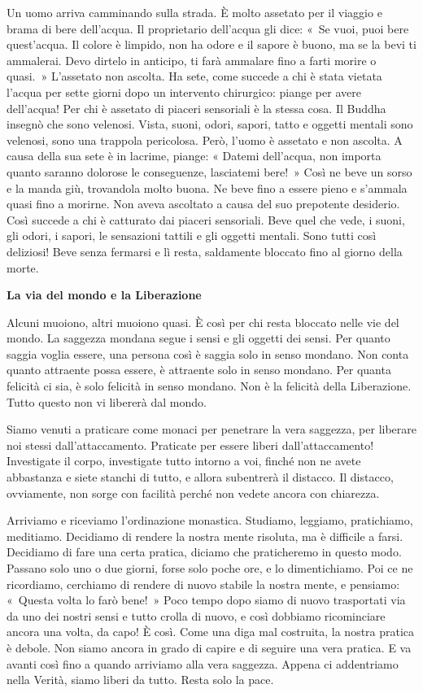 Un uomo arriva camminando sulla strada. È molto assetato per il viaggio
e brama di bere dell'acqua. Il proprietario dell'acqua gli dice: «~Se
vuoi, puoi bere quest'acqua. Il colore è limpido, non ha odore e il
sapore è buono, ma se la bevi ti ammalerai. Devo dirtelo in anticipo, ti
farà ammalare fino a farti morire o quasi.~» L'assetato non ascolta. Ha
sete, come succede a chi è stata vietata l'acqua per sette giorni dopo
un intervento chirurgico: piange per avere dell'acqua! Per chi è
assetato di piaceri sensoriali è la stessa cosa. Il Buddha insegnò che
sono velenosi. Vista, suoni, odori, sapori, tatto e oggetti mentali sono
velenosi, sono una trappola pericolosa. Però, l'uomo è assetato e non
ascolta. A causa della sua sete è in lacrime, piange: « Datemi
dell'acqua, non importa quanto saranno dolorose le conseguenze,
lasciatemi bere!~» Così ne beve un sorso e la manda giù, trovandola
molto buona. Ne beve fino a essere pieno e s'ammala quasi fino a
morirne. Non aveva ascoltato a causa del suo prepotente desiderio. Così
succede a chi è catturato dai piaceri sensoriali. Beve quel che vede, i
suoni, gli odori, i sapori, le sensazioni tattili e gli oggetti mentali.
Sono tutti così deliziosi! Beve senza fermarsi e lì resta, saldamente
bloccato fino al giorno della morte.

\textbf{La via del mondo e la Liberazione}

Alcuni muoiono, altri muoiono quasi. È così per chi resta bloccato nelle
vie del mondo. La saggezza mondana segue i sensi e gli oggetti dei
sensi. Per quanto saggia voglia essere, una persona così è saggia solo
in senso mondano. Non conta quanto attraente possa essere, è attraente
solo in senso mondano. Per quanta felicità ci sia, è solo felicità in
senso mondano. Non è la felicità della Liberazione. Tutto questo non vi
libererà dal mondo.

Siamo venuti a praticare come monaci per penetrare la vera saggezza, per
liberare noi stessi dall'attaccamento. Praticate per essere liberi
dall'attaccamento! Investigate il corpo, investigate tutto intorno a
voi, finché non ne avete abbastanza e siete stanchi di tutto, e allora
subentrerà il distacco. Il distacco, ovviamente, non sorge con facilità
perché non vedete ancora con chiarezza.

Arriviamo e riceviamo l'ordinazione monastica. Studiamo, leggiamo,
pratichiamo, meditiamo. Decidiamo di rendere la nostra mente risoluta,
ma è difficile a farsi. Decidiamo di fare una certa pratica, diciamo che
praticheremo in questo modo. Passano solo uno o due giorni, forse solo
poche ore, e lo dimentichiamo. Poi ce ne ricordiamo, cerchiamo di
rendere di nuovo stabile la nostra mente, e pensiamo: «~Questa volta lo
farò bene!~» Poco tempo dopo siamo di nuovo trasportati via da uno dei
nostri sensi e tutto crolla di nuovo, e così dobbiamo ricominciare
ancora una volta, da capo! È così. Come una diga mal costruita, la
nostra pratica è debole. Non siamo ancora in grado di capire e di
seguire una vera pratica. E va avanti così fino a quando arriviamo alla
vera saggezza. Appena ci addentriamo nella Verità, siamo liberi da
tutto. Resta solo la pace.

